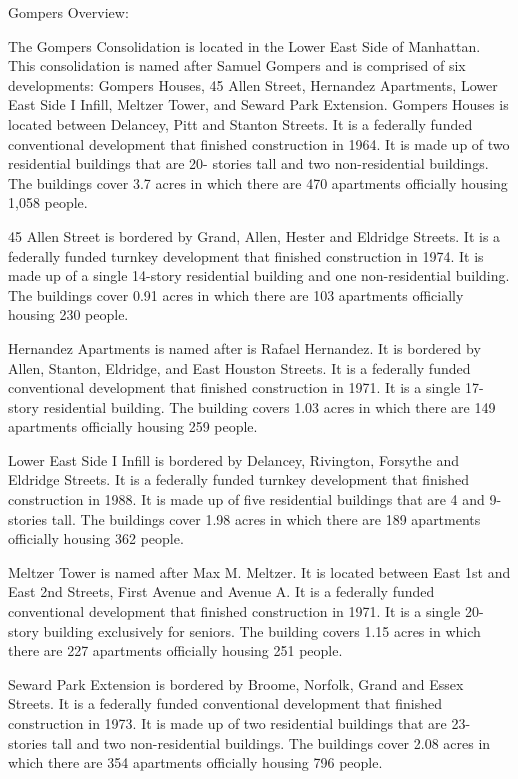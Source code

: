 Gompers Overview:     

   

The Gompers Consolidation is located in the Lower East Side of Manhattan. This consolidation is named after Samuel Gompers and is comprised of six developments: Gompers Houses, 45 Allen Street, Hernandez Apartments, Lower East Side I Infill, Meltzer Tower, and Seward Park Extension. Gompers Houses is located between Delancey, Pitt and Stanton Streets. It is a federally funded conventional development that finished construction in 1964. It is made up of two residential buildings that are 20- stories tall and two non-residential buildings. The buildings cover 3.7 acres in which there are 470 apartments officially housing 1,058 people. 



45 Allen Street is bordered by Grand, Allen, Hester and Eldridge Streets. It is a federally funded turnkey development that finished construction in 1974. It is made up of a single 14-story residential building and one non-residential building. The buildings cover 0.91 acres in which there are 103 apartments officially housing 230 people. 



Hernandez Apartments is named after is Rafael Hernandez. It is bordered by Allen, Stanton, Eldridge, and East Houston Streets. It is a federally funded conventional development that finished construction in 1971. It is a single 17- story residential building. The building covers 1.03 acres in which there are 149 apartments officially housing 259 people. 



Lower East Side I Infill is bordered by Delancey, Rivington, Forsythe and Eldridge Streets. It is a federally funded turnkey development that finished construction in 1988. It is made up of five residential buildings that are 4 and 9- stories tall. The buildings cover 1.98 acres in which there are 189 apartments officially housing 362 people. 



Meltzer Tower is named after Max M. Meltzer. It is located between East 1st and East 2nd Streets, First Avenue and Avenue A. It is a federally funded conventional development that finished construction in 1971. It is a single 20-story building exclusively for seniors. The building covers 1.15 acres in which there are 227 apartments officially housing 251 people. 



Seward Park Extension is bordered by Broome, Norfolk, Grand and Essex Streets. It is a federally funded conventional development that finished construction in 1973. It is made up of two residential buildings that are 23- stories tall and two non-residential buildings. The buildings cover 2.08 acres in which there are 354 apartments officially housing 796 people.